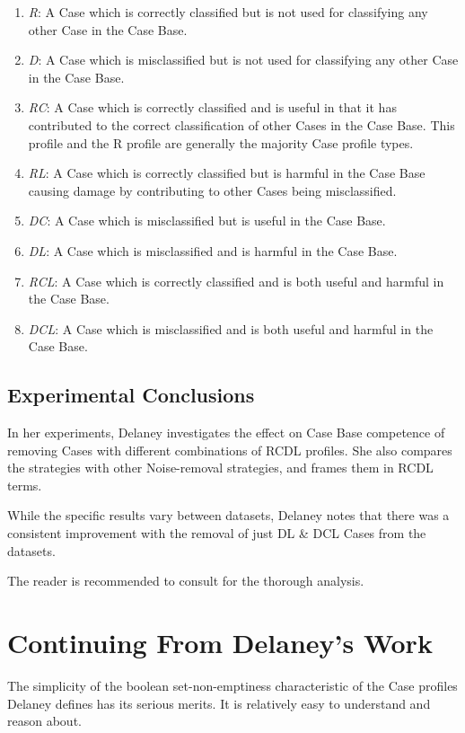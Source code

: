 \documentclass[a4paper,11pt]{report}
\begin{document}
\begin{enumerate}
	\item \emph{R}: A Case which is correctly classified but is not used for classifying any other Case in the Case Base.
	\item \emph{D}: A Case which is misclassified but is not used for classifying any other Case in the Case Base.
	\item \emph{RC}: A Case which is correctly classified and is useful in that it has contributed to the correct classification of other Cases in the Case Base. This profile and the R profile are generally the majority Case profile types.
	\item \emph{RL}: A Case which is correctly classified but is harmful in the Case Base causing damage by contributing to other Cases being misclassified.
	\item \emph{DC}: A Case which is misclassified but is useful in the Case Base. 
	\item \emph{DL}: A Case which is misclassified and is harmful in the Case Base.
	\item \emph{RCL}: A Case which is correctly classified and is both useful and harmful in the Case Base.
	\item \emph{DCL}: A Case which is misclassified and is both useful and harmful in the Case Base.
\end{enumerate}


\subsection{Experimental Conclusions}
In her experiments, Delaney investigates the effect on Case Base competence of removing Cases with different combinations of RCDL profiles. She also compares the strategies with other Noise-removal strategies, and frames them in RCDL terms.

While the specific results vary between datasets, Delaney notes that there was a consistent improvement with the removal of just DL \& DCL Cases from the datasets. 

The reader is recommended to consult \citet{Delany2009} for the thorough analysis.

\section{Continuing From Delaney's Work}
The simplicity of the boolean set-non-emptiness characteristic of the Case profiles Delaney defines has its serious merits. It is relatively easy to understand and reason about. 
\end{document}
